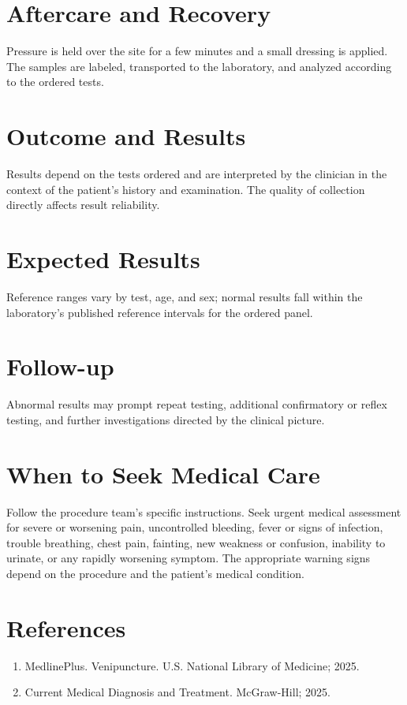 \section*{Aftercare and Recovery}
Pressure is held over the site for a few minutes and a small dressing is applied. The samples are labeled, transported to the laboratory, and analyzed according to the ordered tests.
\section*{Outcome and Results}
Results depend on the tests ordered and are interpreted by the clinician in the context of the patient's history and examination. The quality of collection directly affects result reliability.
\section*{Expected Results}
Reference ranges vary by test, age, and sex; normal results fall within the laboratory's published reference intervals for the ordered panel.
\section*{Follow-up}
Abnormal results may prompt repeat testing, additional confirmatory or reflex testing, and further investigations directed by the clinical picture.
\section*{When to Seek Medical Care}
Follow the procedure team's specific instructions. Seek urgent medical assessment for severe or worsening pain, uncontrolled bleeding, fever or signs of infection, trouble breathing, chest pain, fainting, new weakness or confusion, inability to urinate, or any rapidly worsening symptom. The appropriate warning signs depend on the procedure and the patient's medical condition.

\section*{References}
\begin{enumerate}
  \item MedlinePlus. Venipuncture. U.S. National Library of Medicine; 2025.
  \item Current Medical Diagnosis and Treatment. McGraw-Hill; 2025.
\end{enumerate}

\clearpage
